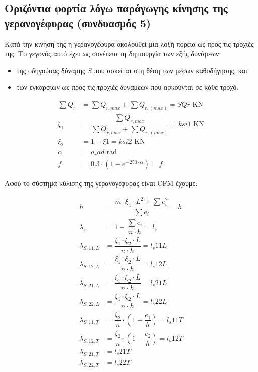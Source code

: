 \subsection{Οριζόντια φορτία λόγω παράγωγης κίνησης της γερανογέφυρας (συνδυασμός 5)}

Κατά την κίνηση της η γερανογέφυρα ακολουθεί μια λοξή πορεία ως προς τις τροχιές της. Το γεγονός
αυτό έχει ως συνέπεια τη δημιουργία των εξής δυνάμεων:

\begin{itemize}
    \item της οδηγούσας δύναμης $S$ που ασκείται στη θέση των μέσων καθοδήγησης, και
    \item των εγκάρσιων ως προς τις τροχιές δυνάμεων που ασκούνται σε κάθε τροχό.
\end{itemize}

\begin{align*}
    \sum{Q_r} &= \displaystyle\sum{Q_{r,max}} + \displaystyle\sum{Q_{r,(max)}} = {{ SQr }} \text{ KN} \\
    \xi_1     &= \dfrac{\displaystyle\sum{Q_{r,max}}}{\displaystyle\sum{Q_{r,max}} + \displaystyle\sum{Q_{r,(max)}}} = {{ ksi1 }} \text{ KN} \\
    \xi_2     &= 1 - \xi1 = {{ ksi2 }} \text{ KN} \\
    \alpha    &= {{ a_rad }} \text{ rad} \\
    f         &= 0.3 \cdot \left(1 - e^{-250 \cdot \alpha}\right) = {{ f }}
\end{align*}

Αφού το σύστημα κύλισης της γερανογέφυρας είναι CFM έχουμε:

\begin{align*}
    h                &= \dfrac{m \cdot \xi_1 \cdot L^2 + \sum{e_i^2}}{\sum{e_i}} = {{ h }} \\
    \lambda_s        &= 1 - \dfrac{\sum{e_i}}{n \cdot h} =  {{ l_s }} \\
    \lambda_{S,11,L} &= \dfrac{\xi_1 \cdot \xi_2 \cdot L}{n \cdot h}= {{ l_s11L }} \\
    \lambda_{S,12,L} &= \dfrac{\xi_1 \cdot \xi_2 \cdot L}{n \cdot h}= {{ l_s12L }} \\
    \lambda_{S,21,L} &= \dfrac{\xi_1 \cdot \xi_2 \cdot L}{n \cdot h}= {{ l_s21L }} \\
    \lambda_{S,22,L} &= \dfrac{\xi_1 \cdot \xi_2 \cdot L}{n \cdot h}= {{ l_s22L }} \\
    \lambda_{S,11,T} &= \dfrac{\xi_2}{n} \cdot \left(1 - \dfrac{e_1}{h}\right) = {{ l_s11T }} \\
    \lambda_{S,12,T} &= \dfrac{\xi_2}{n} \cdot \left(1 - \dfrac{e_2}{h}\right) = {{ l_s12T }} \\
    \lambda_{S,21,T} &= {{ l_s21T }} \\
    \lambda_{S,22,T} &= {{ l_s22T }}
\end{align*}

